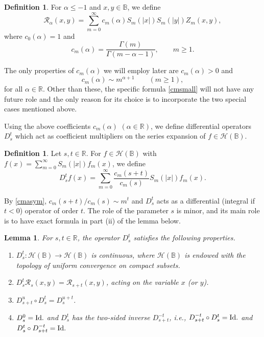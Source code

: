 \documentclass{amsart}
\newtheorem{lemma}[theorem]{Lemma}
\theoremstyle{definition}
\newtheorem{definition}[theorem]{Definition}
\theoremstyle{remark}
\begin{document}
\begin{definition}\label{Dkernel}
For $\alpha\le -1$ and $x,y\in\mathbb B$, we define
\begin{equation*}
\mathcal R_{\alpha}(x,y)=\sum_{m=0}^\infty c_m(\alpha)
S_m(\vert x\vert)S_m(\vert y\vert)Z_m(x,y),
\end{equation*}
where $c_0(\alpha)=1$ and
\begin{equation}\label{cmsmall}
c_m(\alpha)=\frac{\Gamma(m)}{\Gamma(m-\alpha-1)},
\qquad m\ge 1.
\end{equation}
\end{definition}
The only properties of $c_m(\alpha)$ we will employ later are
$c_m(\alpha)>0$ and
\begin{equation}\label{cmasym}
c_m(\alpha)\sim m^{\alpha+1}
\qquad (m\ge 1),
\end{equation}
for all $\alpha\in\mathbb R$.
Other than these, the specific formula \eqref{cmsmall} will not have
any future role and the only reason for its choice is to incorporate
the two special cases mentioned above.

Using the above coefficients $c_m(\alpha)$ $(\alpha\in\mathbb R)$,
we define differential operators $D^t_s$ which act as coefficient
multipliers on the series expansion
of $f\in\mathcal H(\mathbb B)$.

\begin{definition}
Let $s,t\in\mathbb R$.
For $f\in\mathcal H(\mathbb B)$ with
$f(x)=\sum_{m=0}^\infty S_m(\vert x\vert)f_m(x)$, we define
\begin{equation*}
D^t_sf(x)=\sum_{m=0}^\infty \frac{c_m(s+t)}{c_m(s)}
S_m(\vert x\vert)f_m(x).
\end{equation*}
\end{definition}

By \eqref{cmasym}, $c_m(s+t)/c_m(s)\sim m^t$ and $D^t_s$ acts as a
differential (integral if $t<0$) operator of order $t$.
The role of the parameter $s$ is minor, and its main role is to have
exact formula in part (ii) of the lemma below.

\begin{lemma}\label{LPropDst}
For $s,t\in\mathbb R$, the operator $D^t_s$ satisfies the following
properties.
\begin{enumerate}
\item[(i)] $D^t_s:\mathcal H(\mathbb B)\to\mathcal H(\mathbb B)$
is continuous, where $\mathcal H(\mathbb B)$ is endowed with the topology
of uniform convergence on compact subsets.
\item[(ii)] $D^t_s\mathcal R_s(x,y)=\mathcal R_{s+t}(x,y)$,
acting on the variable $x$ (or $y$).
\item[(iii)] $D^{u}_{s+t}\circ D^t_s=D^{u+t}_s$.
\item[(iv)] $D^0_s=\textup{Id}.$ and $D^t_s$ has the two-sided inverse
$D^{-t}_{s+t}$, i.e., $D^{-t}_{s+t}\circ D^t_s=\textup{Id}.$ and
$D^t_s\circ D^{-t}_{s+t}=\textup{Id}.$
\end{enumerate}
\end{lemma}
\end{document}
